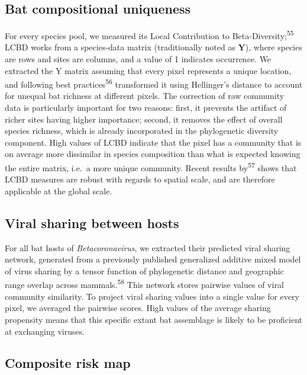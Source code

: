 \documentclass[11pt]{article}
\begin{document}
\hypertarget{bat-compositional-uniqueness}{%
\subsection{Bat compositional
uniqueness}\label{bat-compositional-uniqueness}}

For every species pool, we measured its Local Contribution to
Beta-Diversity;\textsuperscript{55} LCBD works from a species-data
matrix (traditionally noted as \(\mathbf{Y}\)), where species are rows
and sites are columns, and a value of 1 indicates occurrence. We
extracted the Y matrix assuming that every pixel represents a unique
location, and following best practices\textsuperscript{56} transformed
it using Hellinger's distance to account for unequal bat richness at
different pixels. The correction of raw community data is particularly
important for two reasons: first, it prevents the artifact of richer
sites having higher importance; second, it removes the effect of overall
species richness, which is already incorporated in the phylogenetic
diversity component. High values of LCBD indicate that the pixel has a
community that is on average more dissimilar in species composition than
what is expected knowing the entire matrix, i.e.~a more unique
community. Recent results by\textsuperscript{57} shows that LCBD
measures are robust with regards to spatial scale, and are therefore
applicable at the global scale.

\hypertarget{viral-sharing-between-hosts}{%
\subsection{Viral sharing between
hosts}\label{viral-sharing-between-hosts}}

For all bat hosts of \emph{Betacoronavirus}, we extracted their
predicted viral sharing network, generated from a previously published
generalized additive mixed model of virus sharing by a tensor function
of phylogenetic distance and geographic range overlap across
mammals.\textsuperscript{58} This network stores pairwise values of
viral community similarity. To project viral sharing values into a
single value for every pixel, we averaged the pairwise scores. High
values of the average sharing propensity means that this specific extant
bat assemblage is likely to be proficient at exchanging viruses.

\hypertarget{composite-risk-map}{%
\subsection{Composite risk map}\label{composite-risk-map}}
\end{document}
